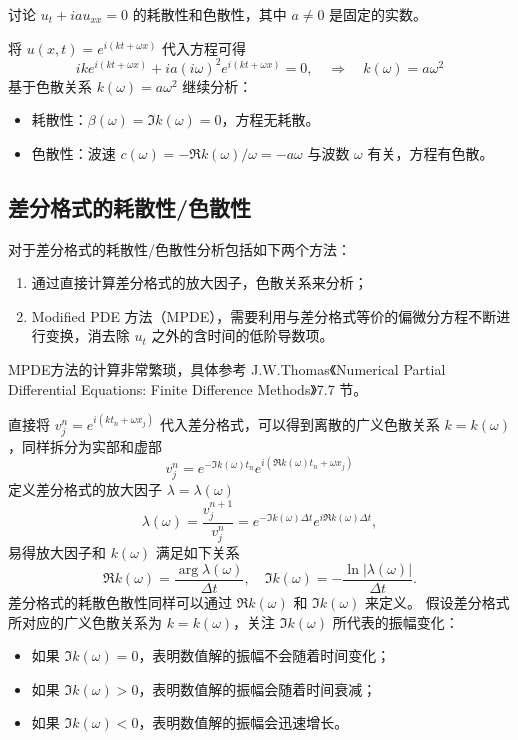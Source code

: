 \begin{example}
    讨论 $u_t + i a u_{xx} = 0$ 的耗散性和色散性，其中 $a \neq 0$ 是固定的实数。
\end{example}

\begin{solution*}
    将 $u(x,t) = e^{i(k t+\omega x)}$ 代入方程可得
    \[
        i k e^{i(k t+\omega x)} + i a (i \omega)^2 e^{i(k t+\omega x)} = 0,
        \quad \Rightarrow \quad
        k(\omega) = a \omega^2
    \]
    基于色散关系 $ k(\omega) = a \omega^2$ 继续分析：
    \begin{itemize}
        \item 耗散性：$\beta(\omega) = \Im k(\omega) = 0$，方程无耗散。
        \item 色散性：波速 $c(\omega) = - \Re k(\omega) / \omega = - a \omega$ 与波数 $\omega$ 有关，方程有色散。
    \end{itemize}
\end{solution*}


\subsection{差分格式的耗散性/色散性}

对于差分格式的耗散性/色散性分析包括如下两个方法：
\begin{enumerate}
    \item 通过直接计算差分格式的放大因子，色散关系来分析；
    \item Modified PDE 方法（MPDE），需要利用与差分格式等价的偏微分方程不断进行变换，消去除 $u_t$ 之外的含时间的低阶导数项。
\end{enumerate}

\begin{remark}
    MPDE方法的计算非常繁琐，具体参考 J.W.Thomas《Numerical Partial Differential Equations: Finite Difference Methods》7.7 节。
\end{remark}

直接将 $v_j^n = e^{i(k t_n+\omega x_j)}$ 代入差分格式，可以得到离散的广义色散关系 $k=k(\omega)$，同样拆分为实部和虚部
\[
    v_j^n = e^{-\Im k(\omega) t_n} e^{i(\Re k(\omega) t_n + \omega x_j)}
\]
定义差分格式的放大因子 $\lambda = \lambda(\omega)$
\[
    \lambda(\omega) = \frac{v_j^{n+1}}{v_j^n} = e^{-\Im k(\omega) \Delta t} e^{ i \Re k(\omega) \Delta t},
\]
易得放大因子和 $k(\omega)$ 满足如下关系
\[
    \Re k(\omega) = \frac{\arg \lambda(\omega)}{\Delta t},\quad \Im k(\omega) = - \frac{\ln |\lambda(\omega)|}{\Delta t}.
\]
差分格式的耗散色散性同样可以通过 $\Re k(\omega)$ 和 $\Im k(\omega)$ 来定义。
假设差分格式所对应的广义色散关系为 $k=k(\omega)$，关注 $\Im k(\omega)$ 所代表的振幅变化：
\begin{itemize}
    \item 如果 $\Im k(\omega) = 0$，表明数值解的振幅不会随着时间变化；
    \item 如果 $\Im k(\omega) > 0$，表明数值解的振幅会随着时间衰减；
    \item 如果 $\Im k(\omega) < 0$，表明数值解的振幅会迅速增长。
\end{itemize}

